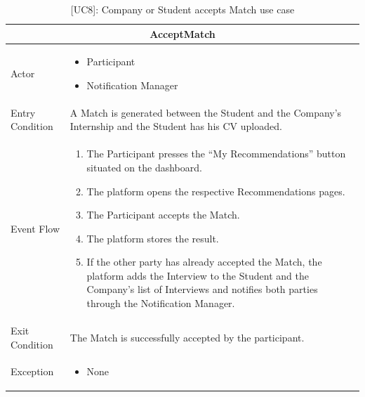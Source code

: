 \begin{table}[H]
    \centering
    \begin{tabular}{|p{3cm}|p{12cm}|}
    \hline
    \multicolumn{2}{|c|}{\textbf{AcceptMatch}} \\ \hline
    Actor & 
    \begin{itemize}
        \item Participant
        \item Notification Manager
    \end{itemize}\\ \hline
    Entry Condition & A Match is generated between the Student and the Company's Internship and the Student has his CV uploaded. \\ \hline
    Event Flow &  
    \begin{enumerate}
        \item The Participant presses the “My Recommendations” button situated on the dashboard.
        \item The platform opens the respective Recommendations pages.
        \item The Participant accepts the Match.
        \item The platform stores the result.
        \item If the other party has already accepted the Match, the platform adds the Interview to the Student and the Company's list of Interviews and notifies both parties through the Notification Manager.
    \end{enumerate} \\ \hline
    Exit Condition & The Match is successfully accepted by the participant.\\ \hline
    Exception & 
    \begin{itemize}
        \item None
    \end{itemize} \\ \hline
    \end{tabular}
    \caption{[UC8]: Company or Student accepts Match use case}
    \label{tab:UC8}
\end{table}

